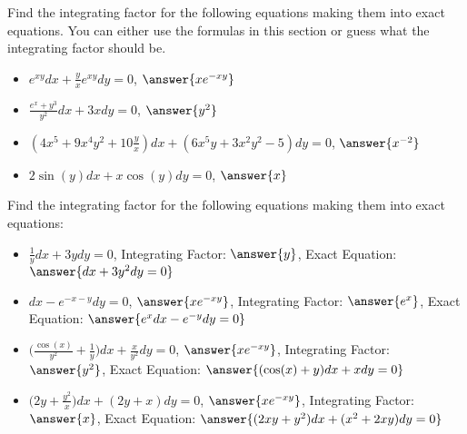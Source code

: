 \documentclass{ximera}
\begin{document}
\begin{exercise}
    Find the integrating factor for the following equations making them into exact equations. You can either use the formulas in this section or guess what the integrating factor should be.
    \begin{itemize}
        \item $e^{xy} dx + \frac{y}{x} e^{xy} dy = 0$, $\answer{xe^{-xy}}$
        \item $\frac{e^x+y^3}{y^2} dx + 3x dy = 0$, $\answer{y^2}$
        \item $(4x^5 + 9x^4y^2 + 10\frac{y}{x})dx + (6x^5y + 3x^2y^2 - 5)dy = 0$, $\answer{x^{-2}}$
        \item $2\sin(y) dx + x\cos(y)dy = 0$, $\answer{x}$
    \end{itemize}
\end{exercise}


\begin{exercise}%
    Find the integrating factor for the following equations making them into exact equations:
    \begin{itemize}
        \item $\frac{1}{y}dx + 3y dy = 0$, 
            Integrating Factor: $\answer{y}$,
            Exact Equation: $\answer{dx + 3y^2dy = 0}$
        \item $dx - e^{-x-y} dy = 0$, $\answer{xe^{-xy}}$, 
            Integrating Factor: $\answer{e^x}$,
            Exact Equation: $\answer{e^x dx - e^{-y}dy= 0}$
        \item $\bigl( \frac{\cos(x)}{y^2} + \frac{1}{y} \bigr) dx + \frac{x}{y^2} dy = 0$, $\answer{xe^{-xy}}$, 
            Integrating Factor: $\answer{y^2}$,
            Exact Equation: $\answer{(\cos(x)+y)dx + xdy = 0}$
        \item $\bigl( 2y + \frac{y^2}{x} \bigr) dx + ( 2y+x )dy = 0$, $\answer{xe^{-xy}}$, 
            Integrating Factor: $\answer{x}$,
            Exact Equation: $\answer{( 2xy+y^2 )dx + (x^2+2xy)dy = 0}$
    \end{itemize}
\end{exercise}

\end{document}
